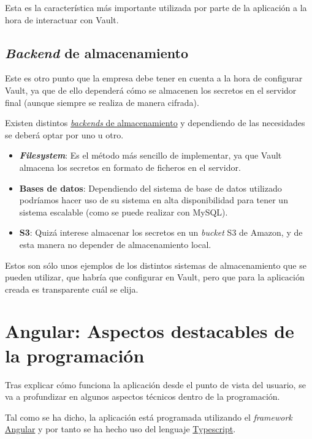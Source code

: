 \documentclass{\ClassPath/viu-tfm-template}
\begin{document}
Esta es la característica más importante utilizada por parte de la aplicación a la hora de interactuar con Vault.


\subsection{\textit{Backend} de almacenamiento}

Este es otro punto que la empresa debe tener en cuenta a la hora de configurar Vault, ya que de ello dependerá cómo se almacenen los secretos en el servidor final (aunque siempre se realiza de manera cifrada).

Existen distintos \href{https://developer.hashicorp.com/vault/docs/configuration/storage}{\textit{backends} de almacenamiento} y dependiendo de las necesidades se deberá optar por uno u otro.

\begin{itemize}
    \item \textbf{\textit{Filesystem}}: Es el método más sencillo de implementar, ya que Vault almacena los secretos en formato de ficheros en el servidor.
    \item \textbf{Bases de datos}: Dependiendo del sistema de base de datos utilizado podríamos hacer uso de su sistema en alta disponibilidad para tener un sistema escalable (como se puede realizar con MySQL).
    \item \textbf{S3}: Quizá interese almacenar los secretos en un \textit{bucket} S3 de Amazon, y de esta manera no depender de almacenamiento local.
\end{itemize}

Estos son sólo unos ejemplos de los distintos sistemas de almacenamiento que se pueden utilizar, que habría que configurar en Vault, pero que para la aplicación creada es transparente cuál se elija.


\section{Angular: Aspectos destacables de la programación}

Tras explicar cómo funciona la aplicación desde el punto de vista del usuario, se va a profundizar en algunos aspectos técnicos dentro de la programación.

Tal como se ha dicho, la aplicación está programada utilizando el \textit{framework} \href{https://angular.io/}{Angular} y por tanto se ha hecho uso del lenguaje \href{https://www.typescriptlang.org/}{Typescript}.
\end{document}
